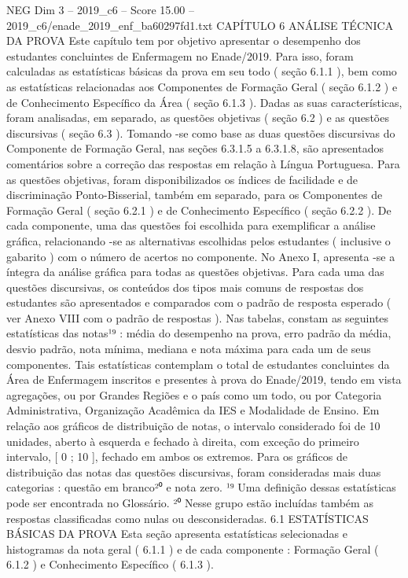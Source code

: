\begin{textsample}{NEG Dim 3 – 2019\_c6 – Score 15.00 – 2019\_c6/enade\_2019\_enf\_ba60297fd1.txt}  \label{ex:f3_neg_270}
CAPÍTULO 6 ANÁLISE TÉCNICA DA PROVA Este capítulo tem por objetivo apresentar o desempenho dos estudantes concluintes de Enfermagem no Enade/2019.
Para isso, foram calculadas as estatísticas básicas da prova em seu todo ( seção 6.1.1 ), bem como as estatísticas relacionadas aos Componentes de Formação Geral ( seção 6.1.2 ) e de Conhecimento Específico da Área ( seção 6.1.3 ).
Dadas as suas características, foram analisadas, em separado, as questões objetivas ( seção 6.2 ) e as questões discursivas ( seção 6.3 ).
Tomando -se como base as duas questões discursivas do Componente de Formação Geral, nas seções 6.3.1.5 a 6.3.1.8, são apresentados comentários sobre a correção das respostas em relação à Língua Portuguesa.
Para as questões objetivas, foram disponibilizados os índices de facilidade e de discriminação Ponto-Bisserial, também em separado, para os Componentes de Formação Geral ( seção 6.2.1 ) e de Conhecimento Específico ( seção 6.2.2 ).
De cada componente, uma das questões foi escolhida para exemplificar a análise gráfica, relacionando -se as alternativas escolhidas pelos estudantes ( inclusive o gabarito ) com o número de acertos no componente.
No Anexo I, apresenta -se a íntegra da análise gráfica para todas as questões objetivas.
Para cada uma das questões discursivas, os conteúdos dos tipos mais comuns de respostas dos estudantes são apresentados e comparados com o padrão de resposta esperado ( ver Anexo VIII com o padrão de respostas ).
Nas tabelas, constam as seguintes estatísticas das notas¹⁹ : média do desempenho na prova, erro padrão da média, desvio padrão, nota mínima, mediana e nota máxima para cada um de seus componentes.
Tais estatísticas contemplam o total de estudantes concluintes da Área de Enfermagem inscritos e presentes à prova do Enade/2019, tendo em vista agregações, ou por Grandes Regiões e o país como um todo, ou por Categoria Administrativa, Organização Acadêmica da IES e Modalidade de Ensino.
Em relação aos gráficos de distribuição de notas, o intervalo considerado foi de 10 unidades, aberto à esquerda e fechado à direita, com exceção do primeiro intervalo, [ 0 ; 10 ], fechado em ambos os extremos.
Para os gráficos de distribuição das notas das questões discursivas, foram consideradas mais duas categorias : questão em branco²⁰ e nota zero. ¹⁹ Uma definição dessas estatísticas pode ser encontrada no Glossário. ²⁰ Nesse grupo estão incluídas também as respostas classificadas como nulas ou desconsideradas. 6.1 ESTATÍSTICAS BÁSICAS DA PROVA Esta seção apresenta estatísticas selecionadas e histogramas da nota geral ( 6.1.1 ) e de cada componente : Formação Geral ( 6.1.2 ) e Conhecimento Específico ( 6.1.3 ).

\end{textsample}
